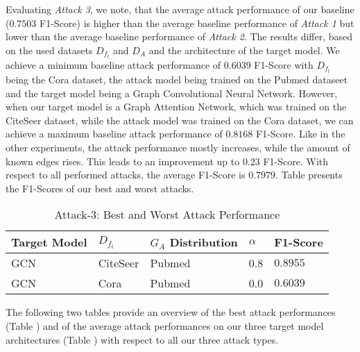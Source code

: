             Evaluating \emph{Attack 3}, we note, that the average attack performance of our baseline ($0.7503$ F1-Score) is higher than the average baseline performance of \emph{Attack 1} but lower than the average baseline performance of \emph{Attack 2}.
            The results differ, based on the used datasets $D_{f_t}$ and $D_A$ and the architecture of the target model.
            We achieve a minimum baseline attack performance of $0.6039$ F1-Score with $D_{f_t}$ being the Cora dataset, the attack model being trained on the Pubmed dataseet and the target model being a Graph Convolutional Neural Network.
            However, when our target model is a Graph Attention Network, which was trained on the CiteSeer dataset, while the attack model was trained on the Cora dataset, we can achieve a maximum baseline attack performance of $0.8168$ F1-Score.  
            Like in the other experiments, the attack performance mostly increases, while the amount of known edges rises.
            This leads to an improvement up to $0.23$ F1-Score.
            With respect to all performed attacks, the average F1-Score is $0.7979$.
            Table  presents the F1-Scores of our best and worst attacks.
            
            \vspace{0.48cm}
            \begin{table}[!h]
                \centering
                \footnotesize
                \begin{tabular}{l|l|l|l|l|}
                \toprule
                Target Model & $D_{f_t}$ & $G_A$ Distribution & $\alpha$ & F1-Score \\
                \midrule
                GCN & CiteSeer & Pubmed & 0.8 & $0.8955$ \\
                GCN & Cora     & Pubmed & 0.0 & $0.6039$ \\
                
                \bottomrule
                \end{tabular}
                \caption{Attack-3: Best and Worst Attack Performance}
                \label{table:attack3-best-and-worst-performance}
            \end{table}
        
        The following two tables provide an overview of the best attack performances (Table ) and of the average attack performances on our three target model architectures (Table ) with respect to all our three attack types.

